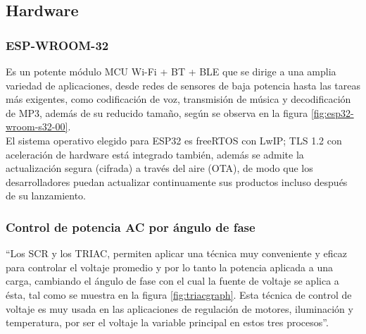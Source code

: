 \subsection{Hardware}

\subsubsection{ESP-WROOM-32}

Es un potente módulo MCU Wi-Fi + BT + BLE que se dirige a una amplia variedad de aplicaciones, desde redes de sensores de baja potencia hasta las tareas más exigentes, como codificación de voz, transmisión de música y decodificación de MP3, además de su reducido tamaño, según se observa en la figura \ref{fig:esp32-wroom-s32-00}.\\

El sistema operativo elegido para ESP32 es freeRTOS con LwIP; TLS 1.2 con aceleración de hardware está integrado también, además se admite la actualización segura (cifrada) a través del aire (OTA), de modo que los desarrolladores puedan actualizar continuamente sus productos incluso después de su lanzamiento.\cite{EW32}\\


\subsubsection{Control de potencia AC por ángulo de fase}

``Los SCR y los TRIAC, permiten aplicar una técnica muy conveniente y eficaz para controlar el voltaje promedio y por lo tanto la potencia aplicada a una carga, cambiando el ángulo de fase con el cual la fuente de voltaje se aplica a ésta, tal como se muestra en la figura \ref{fig:triacgraph}. Esta técnica de control de voltaje es muy usada en las aplicaciones de regulación de motores, iluminación y temperatura, por ser el voltaje la variable principal en estos tres procesos''.\cite{CEKIT}\\



